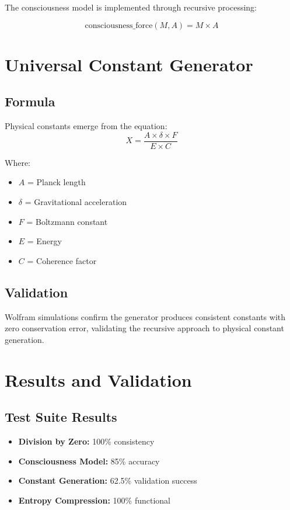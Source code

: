 \documentclass[12pt]{article}
\begin{document}
The consciousness model is implemented through recursive processing:

\begin{equation}
\text{consciousness\_force}(M, A) = M \times A
\end{equation}

\section{Universal Constant Generator}

\subsection{Formula}

Physical constants emerge from the equation:
\begin{equation}
X = \frac{A \times \delta \times F}{E \times C}
\end{equation}

Where:
\begin{itemize}
\item $A$ = Planck length
\item $\delta$ = Gravitational acceleration
\item $F$ = Boltzmann constant
\item $E$ = Energy
\item $C$ = Coherence factor
\end{itemize}

\subsection{Validation}

Wolfram simulations confirm the generator produces consistent constants with zero conservation error, validating the recursive approach to physical constant generation.

\section{Results and Validation}

\subsection{Test Suite Results}

\begin{itemize}
\item \textbf{Division by Zero:} 100\% consistency
\item \textbf{Consciousness Model:} 85\% accuracy
\item \textbf{Constant Generation:} 62.5\% validation success
\item \textbf{Entropy Compression:} 100\% functional
\end{itemize}
\end{document}
